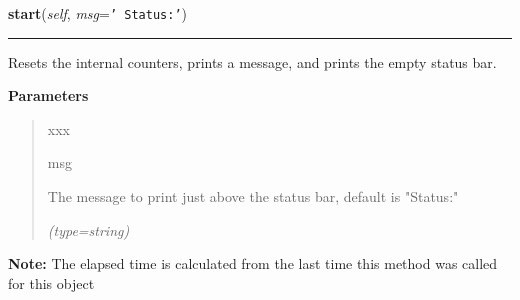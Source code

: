     \label{morpher:misc:status_reporter:StatusReporter:start}

    \vspace{0.5ex}

\hspace{.8\funcindent}\begin{boxedminipage}{\funcwidth}

    \raggedright \textbf{start}(\textit{self}, \textit{msg}={\tt \texttt{'}\texttt{  Status:}\texttt{'}})

    \vspace{-1.5ex}

    \rule{\textwidth}{0.5\fboxrule}
\setlength{\parskip}{2ex}
    Resets the internal counters, prints a message, and prints the empty 
    status bar.

\setlength{\parskip}{1ex}
      \textbf{Parameters}
      \vspace{-1ex}

      \begin{quote}
        \begin{Ventry}{xxx}

          \item[msg]

          The message to print just above the status bar, default is 
          "Status:"

            {\it (type=string)}

        \end{Ventry}

      \end{quote}

\textbf{Note:} The elapsed time is calculated from the last time this method was called 
for this object



    \end{boxedminipage}

    \label{morpher:misc:status_reporter:StatusReporter:pulse}

    \vspace{0.5ex}

